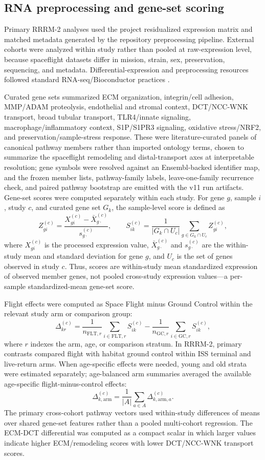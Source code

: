 \documentclass[11pt]{article}
\begin{document}
\subsection{RNA preprocessing and gene-set scoring}

Primary RRRM-2 analyses used the project residualized expression matrix and matched metadata generated by the repository preprocessing pipeline. External cohorts were analyzed within study rather than pooled at raw-expression level, because spaceflight datasets differ in mission, strain, sex, preservation, sequencing, and metadata. Differential-expression and preprocessing resources followed standard RNA-seq/Bioconductor practices \citep{ritchie2015limma,love2014deseq2,robinson2010edger}.

Curated gene sets summarized ECM organization, integrin/cell adhesion, MMP/ADAM proteolysis, endothelial and stromal context, DCT/NCC-WNK transport, broad tubular transport, TLR4/innate signaling, macrophage/inflammatory context, S1P/S1PR3 signaling, oxidative stress/NRF2, and preservation/sample-stress response. These were literature-curated panels of canonical pathway members rather than imported ontology terms, chosen to summarize the spaceflight remodeling and distal-transport axes at interpretable resolution; gene symbols were resolved against an Ensembl-backed identifier map, and the frozen member lists, pathway-family labels, leave-one-family recurrence check, and paired pathway bootstrap are emitted with the v11 run artifacts. Gene-set scores were computed separately within each study. For gene $g$, sample $i$, study $c$, and curated gene set $G_k$, the sample-level score is defined as
\[
Z_{g i}^{(c)}=\frac{X_{g i}^{(c)}-\bar{X}_{g\cdot}^{(c)}}{s_{g\cdot}^{(c)}}, \qquad
S_{i k}^{(c)}=\frac{1}{|G_k\cap U_c|}\sum_{g\in G_k\cap U_c} Z_{g i}^{(c)},
\]
where $X_{g i}^{(c)}$ is the processed expression value, $\bar{X}_{g\cdot}^{(c)}$ and $s_{g\cdot}^{(c)}$ are the within-study mean and standard deviation for gene $g$, and $U_c$ is the set of genes observed in study $c$. Thus, scores are within-study mean standardized expression of observed member genes, not pooled cross-study expression values---a per-sample standardized-mean gene-set score.

Flight effects were computed as Space Flight minus Ground Control within the relevant study arm or comparison group:
\[
\Delta_{k r}^{(c)}=\frac{1}{n_{\mathrm{FLT},r}}\sum_{i\in \mathrm{FLT},r}S_{ik}^{(c)}
-\frac{1}{n_{\mathrm{GC},r}}\sum_{i\in \mathrm{GC},r}S_{ik}^{(c)},
\]
where $r$ indexes the arm, age, or comparison stratum. In RRRM-2, primary contrasts compared flight with habitat ground control within ISS terminal and live-return arms. When age-specific effects were needed, young and old strata were estimated separately; age-balanced arm summaries averaged the available age-specific flight-minus-control effects:
\[
\Delta_{k,\mathrm{arm}}^{(c)}=\frac{1}{|A|}\sum_{a\in A}\Delta_{k,\mathrm{arm},a}^{(c)}.
\]
The primary cross-cohort pathway vectors used within-study differences of means over shared gene-set features rather than a pooled multi-cohort regression. The ECM-DCT differential was computed as a compact scalar in which larger values indicate higher ECM/remodeling scores with lower DCT/NCC-WNK transport scores.
\end{document}
